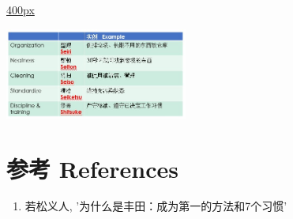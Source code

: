 \href{文件:5S_五常法_Screenshot_2023-08-03_211606.jpg}{400px}

\includegraphics[width=6cm]{5S_五常法_Screenshot_2023-08-03_211606.jpg}\\

\hypertarget{ux53c2ux8003-references}{%
\section{参考 References}\label{ux53c2ux8003-references}}

\begin{enumerate}
\tightlist
\item
  若松义人, '为什么是丰田：成为第一的方法和7个习惯'
\end{enumerate}



